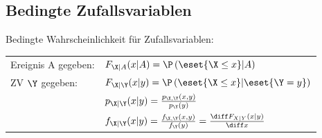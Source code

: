 \documentclass[german,color,6pt]{latex4ei/latex4ei_sheet}
\begin{document}
\begin{sectionbox}
	\subsection{Bedingte Zufallsvariablen}
	Bedingte Wahrscheinlichkeit für Zufallsvariablen:\\
	\begin{tabular}{ll}
		Ereignis A gegeben: & $F_{\X|A}(x|A) = \P\left(\eset{\X \le x} | A\right)$\\
		ZV $\Y$ gegeben: & $F_{\X|\Y}(x|y)= \P\left(\eset{\X \le x} | \eset{\Y = y}\right)$\\
		& $p_{\X|\Y}(x|y) = \frac{p_{\X,\Y}(x,y)}{p_{\Y}(y)}$\\
		& $f_{\X|\Y}(x|y) = \frac{f_{\X,\Y}(x,y)}{f_{\Y}(y)} = \frac{\diff F_{X|Y}(x|y)}{\diff x}$\\
	\end{tabular}

\end{sectionbox}

\end{document}
